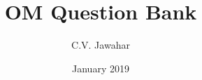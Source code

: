 \documentclass[twocolumn]{article}
\title{OM Question Bank}
\author{C.V. Jawahar}
\date{January 2019}
\begin{document}
\maketitle
\tableofcontents
\newpage
~
\newpage

\end{document}
